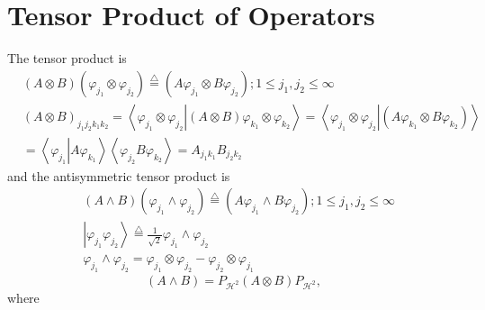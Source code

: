\documentclass[aps,preprint]{revtex4}%
\begin{document}
\section{Tensor Product of Operators}

The tensor product is
\begin{align}
&  \left(  A\otimes B\right)  \left(  \varphi_{j_{1}}\otimes\varphi_{j_{2}%
}\right)  \overset{\bigtriangleup}{=}\left(  A\varphi_{j_{1}}\otimes
B\varphi_{j_{2}}\right)  ;1\leq j_{1},j_{2}\leq\infty\nonumber\\
&  \left(  A\otimes B\right)  _{j_{1}j_{2}k_{1}k_{2}}=\left\langle
\varphi_{j_{1}}\otimes\varphi_{j_{2}}\left\vert \left(  A\otimes B\right)
\varphi_{k_{1}}\otimes\varphi_{k_{2}}\right.  \right\rangle =\left\langle
\varphi_{j_{1}}\otimes\varphi_{j_{2}}\left\vert \left(  A\varphi_{k_{1}%
}\otimes B\varphi_{k_{2}}\right)  \right.  \right\rangle \nonumber\\
&  =\left\langle \varphi_{j_{1}}\left\vert A\varphi_{k_{1}}\right.
\right\rangle \left\langle \varphi_{j_{2}}B\varphi_{k_{2}}\right\rangle
=A_{j_{1}k_{1}}B_{j_{2}k_{2}}%
\end{align}
and the antisymmetric tensor product is
\begin{align}
&  \left(  A\wedge B\right)  \left(  \varphi_{j_{1}}\wedge\varphi_{j_{2}%
}\right)  \overset{\bigtriangleup}{=}\left(  A\varphi_{j_{1}}\wedge
B\varphi_{j_{2}}\right)  ;1\leq j_{1},j_{2}\leq\infty\nonumber\\
&  \left\vert \varphi_{j_{1}}\varphi_{j_{2}}\right\rangle
\overset{\bigtriangleup}{=}\frac{1}{\sqrt{2}}\varphi_{j_{1}}\wedge
\varphi_{j_{2}}\nonumber\\
&  \varphi_{j_{1}}\wedge\varphi_{j_{2}}=\varphi_{j_{1}}\otimes\varphi_{j_{2}%
}-\varphi_{j_{2}}\otimes\varphi_{j_{1}}%
\end{align}%
\begin{equation}
\left(  A\wedge B\right)  =P_{\mathcal{H}^{2}}\left(  A\otimes B\right)
P_{\mathcal{H}^{2}},
\end{equation}
where%
\end{document}
